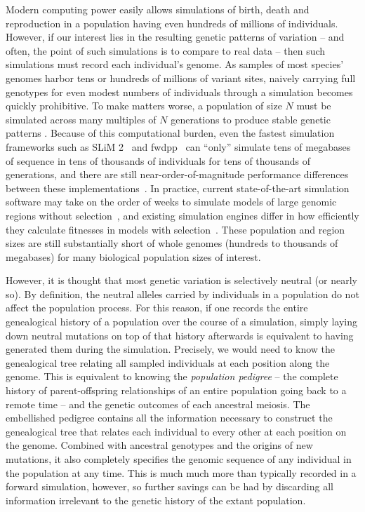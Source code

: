 \documentclass{article}
\begin{document}
Modern computing power easily allows simulations of birth, death and reproduction
in a population having even hundreds of millions of individuals.
However, if our interest lies in the resulting genetic patterns of variation
-- and often, the point of such simulations is to compare to real data --
then such simulations must record each individual's genome.
As samples of most species' genomes harbor tens or hundreds of millions of variant sites,
naively carrying full genotypes for even modest numbers of individuals through a simulation
becomes quickly prohibitive.
To make matters worse,
a population of size $N$ must be simulated across many multiples of $N$ generations
to produce stable genetic patterns \citep{wright1931evolution, wakeley2005coalescent}.
Because of this computational burden, even the fastest simulation frameworks such as
SLiM 2~\citep{haller2017flexible} and fwdpp~\citep{fwdpp}
can ``only'' simulate tens of megabases of sequence in tens of thousands of individuals
for tens of thousands of generations, and there are still near-order-of-magnitude performance differences between these
implementations~\citep{haller2017flexible}.
In practice, current state-of-the-art simulation software may take on the order of
weeks to simulate models of large genomic regions without selection~\citep{fwdpp,Hernandez2015-wf},
and existing simulation engines differ in how efficiently they
calculate fitnesses in models with selection~\citep{fwdpp}.
These population and region sizes are still substantially short of whole genomes
(hundreds to thousands of megabases)
for many biological population sizes of interest.

However, it is thought that most genetic variation is selectively neutral (or nearly so).
By definition, the neutral alleles carried by individuals in a population
do not affect the population process.
For this reason, if one records the entire genealogical history of a population over the course of a simulation,
simply laying down neutral mutations on top of that history afterwards
is equivalent to having generated them during the simulation.
Precisely, we would need to know the genealogical tree relating all sampled individuals
at each position along the genome.
This is equivalent to knowing the \emph{population pedigree} --
the complete history of parent-offspring relationships of an entire population
going back to a remote time -- and the genetic outcomes of each ancestral meiosis.
The embellished pedigree contains all the information necessary
to construct the genealogical tree that relates each individual to every other
at each position on the genome.
Combined with ancestral genotypes and the origins of new mutations,
it also completely specifies the genomic sequence of any individual in the population at any time.
This is much much more than typically recorded in a forward simulation, however,
so further savings can be had by discarding all information irrelevant to the genetic history
of the extant population.
\end{document}
